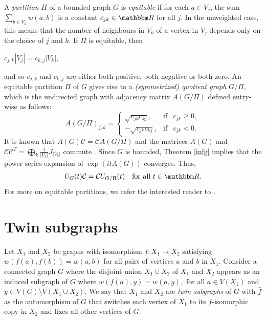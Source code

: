 \documentclass[12pt,a4paper]{article}
\def \Rl {{\mathbbm R}}
\newcommand{\ob}[1]{\left(#1\right)}
\begin{document}
A \textit{partition} $\Pi$ of a bounded graph $G$ is \textit{equitable} if for each $ a\in V_j$, the sum $\sum_{b \in V_k} w(a,b)$ is a constant 
$c_{jk}\in \Rl$ for all $j$. In the unweighted case, this means that the number of neighbours in $V_k$ of a vertex in $ V_j$ depends only on the choice of $j$ and $k$.
If $\Pi$ is equitable, then
\begin{center}
$c_{j,k}|V_j|=c_{k,j}|V_k|$,
\end{center}
and so $c_{j,k}$ and $c_{k,j}$ are either both positive, both negative or both zero. An equitable partition $\Pi$ of $G$ gives rise to a \textit{(symmetrized) quotient graph} $G/\Pi$, which is the undirected graph with adjacency matrix $A(G/\Pi)$ defined entry-wise as follows:
\[A(G/\Pi)_{j,k}= \left\{ \begin{array}{rcl}
 \sqrt{c_{jk}c_{kj}}, & \mbox{if} & c_{jk}\geq 0, \\ 
 -\sqrt{c_{jk}c_{kj}}, & \mbox{if} & c_{jk}<0.
 \end{array}\right.\] 
It is known that $A(G)\mathcal{C} = \mathcal{C}A(G/\Pi)$ and the matrices $A(G)$ and $\mathcal{C}\mathcal{C}^T=\bigoplus_{k} \frac{1}{|V_k|}J_{|V_k|}$ commute \cite[Lemma 4.2]{god2}. Since $G$ is bounded, Theorem \ref{infg} implies that the power series expansion of $\exp{(itA(G))}$ converges. Thus,
\begin{equation}
\label{G/Pi}
U_G(t)\mathcal{C}=\mathcal{C}U_{G/\Pi}(t)\quad \text{for all $t\in\Rl$}.
\end{equation}
For more on equitable partitions, we refer the interested reader to \cite{god0}.

\section{Twin subgraphs}\label{2s_3}

Let $X_1$ and $X_2$ be graphs with isomorphism $f: X_1\to X_2$ satisfying $w\ob{f(a),f(b)}=w(a,b)$ for all pairs of vertices $a$ and $b$ in $X_1.$ Consider a connected graph $G$ where the disjoint union $X_1\cup X_2$ of $X_1$ and $X_2$ appears as an induced subgraph of $G$ where $w\ob{f(a),y}=w(a,y),$ for all $a\in V\ob{X_1}$ and $y\in V(G)\setminus V\ob{X_1\cup X_2}.$ We say that $X_1$ and $X_2$ are \textit{twin subgraphs} of $G$ with $\hat{f}$ as the automorphism of $G$ that switches each vertex of $X_1$ to its $f$-isomorphic copy in $X_2$ and fixes all other vertices of $G$.
\end{document}
